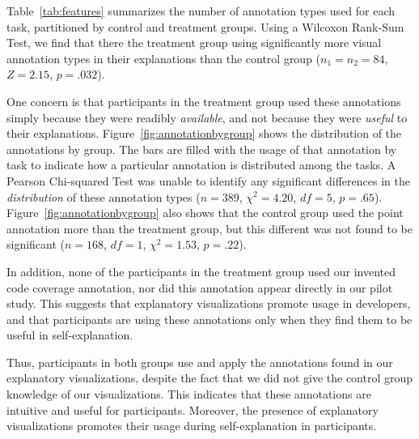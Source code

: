 \documentclass[conference]{IEEEtran}
\begin{document}
Table~\ref{tab:features} summarizes the number of annotation types used for each task, partitioned by control and treatment groups. Using a Wilcoxon Rank-Sum Test, we find that there the treatment group using significantly more visual annotation types in their explanations than the control group ($n_1 = n_2 = 84$, $Z = 2.15$, $p = .032$).

One concern is that participants in the treatment group used these annotations simply because they were readibly \textit{available}, and not because they were \textit{useful} to their explanations. Figure~\ref{fig:annotationbygroup} shows the distribution of the annotations by group. The bars are filled with the usage of that annotation by task to indicate how a particular annotation is distributed among the tasks. A Pearson Chi-squared Test was unable to identify any significant differences in the \emph{distribution} of these annotation types ($n = 389$, $\chi^2 = 4.20$, $df = 5$, $p = .65$). Figure~\ref{fig:annotationbygroup} also shows that the control group used the point annotation more than the treatment group, but this different was not found to be significant ($n = 168$, $df = 1$, $\chi^2 = 1.53$, $p = .22$).

In addition, none of the participants in the treatment group used our invented code coverage annotation, nor did this annotation appear directly in our pilot study. This suggests that explanatory visualizations promote usage in developers, and that participants are using these annotations only when they find them to be useful in self-explanation.

Thus, participants in both groups use and apply the annotations found in our explanatory visualizations, despite the fact that we did not give the control group knowledge of our visualizations. This indicates that these annotations are intuitive and useful for participants. Moreover, the presence of explanatory visualizations promotes their usage during self-explanation in participants.
\end{document}
